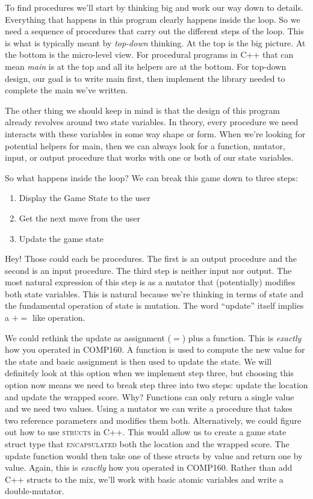 \documentclass[nobib]{tufte-handout}
\begin{document}
To find procedures we'll start by thinking big and work our way down to details. Everything that happens in this program clearly happens inside the loop. So we need a sequence of procedures that carry out the different steps of the loop. This is what is typically meant by \textit{top-down} thinking. At the top is the big picture. At the bottom is the micro-level view. For procedural programs in C++ that can mean \textit{main} is at the top and all its helpers are at the bottom. For top-down design, our goal is to write main first, then implement the library needed to complete the main we've written. 

The other thing we should keep in mind is that the design of this program already revolves around two state variables. In theory, every procedure we need interacts with these variables in some way shape or form. When we're looking for potential helpers for main, then we can always look for a function, mutator, input, or output procedure that works with one or both of our state variables. 

So what happens inside the loop? We can break this game down to three steps:
\begin{enumerate}
\item Display the Game State to the user
\item Get the next move from the user
\item Update the game state
\end{enumerate}
Hey! Those could each be procedures. The first is an output procedure and the second is an input procedure. The third step is neither input nor output. The most natural expression of this step is as a mutator that (potentially) modifies both state variables. This is natural because we're thinking in terms of state and the fundamental operation of state is mutation. The word ``update'' itself implies a $+=$ like operation. 

We could rethink the update as assignment ($=$) plus a function. This is \textit{exactly} how you operated in COMP160. A function is used to compute the new value for the state and basic assignment is then used to update the state. We will definitely look at this option when we implement step three, but choosing this option now means we need to break step three into two steps: update the location and update the wrapped score. Why? Functions can only return a single value and we need two values. Using a mutator we can write a procedure that takes two reference parameters and modifies them both. Alternatively, we could figure out how to use \textsc{structs} in C++. This would allow us to create a game state struct type that \textsc{encapsulated} both the location and the wrapped score. The update function would then take one of these structs by value and return one by value. Again, this is \textit{exactly} how you operated in COMP160. Rather than add C++ structs to the mix, we'll work with basic atomic variables and write a double-mutator. 
\end{document}
